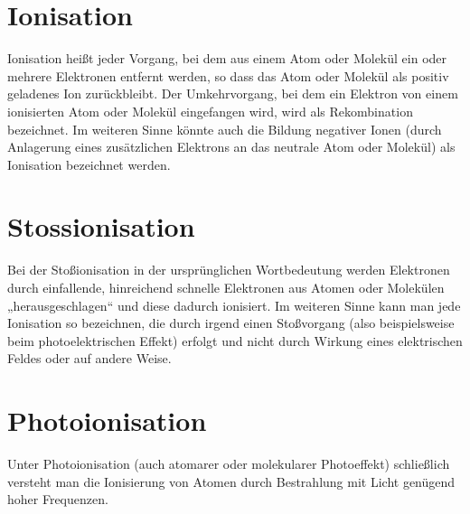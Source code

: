 \section*{Ionisation}
\glqq Ionisation heißt jeder Vorgang, bei dem aus einem Atom oder Molekül ein oder mehrere Elektronen entfernt werden, so dass das Atom oder Molekül als positiv geladenes Ion zurückbleibt. Der Umkehrvorgang, bei dem ein Elektron von einem ionisierten Atom oder Molekül eingefangen wird, wird als Rekombination bezeichnet. Im weiteren Sinne könnte auch die Bildung negativer Ionen (durch Anlagerung eines zusätzlichen Elektrons an das neutrale Atom oder Molekül) als Ionisation bezeichnet werden.\grqq\; \cite{ionisation}\\

\section*{Stossionisation}
\glqq Bei der Stoßionisation in der ursprünglichen Wortbedeutung werden Elektronen durch einfallende, hinreichend schnelle Elektronen aus Atomen oder Molekülen „herausgeschlagen“ und diese dadurch ionisiert. Im weiteren Sinne kann man jede Ionisation so bezeichnen, die durch irgend einen Stoßvorgang (also beispielsweise beim photoelektrischen Effekt) erfolgt und nicht durch Wirkung eines elektrischen Feldes oder auf andere Weise.\grqq\; \cite{stossionisation}\\
\newpage
\section*{Photoionisation}
\glqq Unter Photoionisation (auch atomarer oder molekularer Photoeffekt) schließlich versteht man die Ionisierung von Atomen durch Bestrahlung mit Licht genügend hoher Frequenzen.\grqq\; \cite{photoionisation}\\